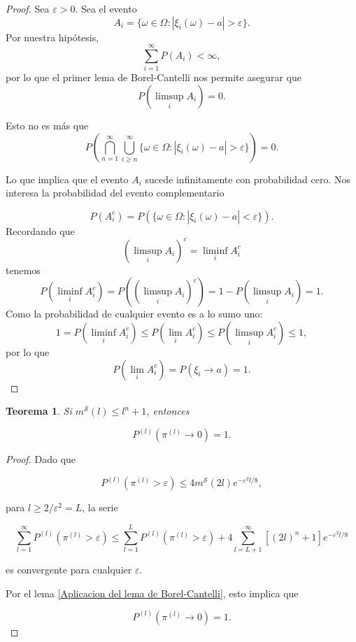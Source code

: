 \documentclass{report}
\newtheorem{thm}{Teorema}[section]
\begin{document}
\begin{proof}
    Sea $\varepsilon > 0$. Sea el evento
    \[
        A_i = \{ \omega \in \Omega : |\xi_i(\omega)-a| > \varepsilon\}.
    \]
Por nuestra hipótesis,
\[
    \sum_{i=1}^{\infty}P(A_i) < \infty,
\]
por lo que el primer lema de Borel-Cantelli nos permite asegurar que
\[
    P\left( \limsup_i A_i \right) = 0.
\]

Esto no es más que
\[
P\left( \bigcap_{n=1}^{\infty} \bigcup_{i\geq n}^{\infty} \{ \omega \in \Omega : |\xi_i(\omega)-a| > \varepsilon\} \right) = 0.
\]

Lo que implica que el evento $A_i$ sucede infinitamente con probabilidad cero. Nos interesa la probabilidad del evento complementario

\[
P(A_i^c) = P(\{ \omega \in \Omega : |\xi_i(\omega)-a| < \varepsilon\}).
\]
Recordando que
\[
\left(\limsup_i A_i\right)^c = \liminf_i A_i^c
\]
tenemos
\[
P\left(\liminf_i A_i^c\right) = P\left(\left(\limsup_i A_i\right)^c\right) = 1 - P\left( \limsup_i A_i \right) = 1.
\]
Como la probabilidad de cualquier evento es a lo sumo uno: 
\[
1 = P\left(\liminf_i A_i^c\right) \leq P\left(\lim_i A_i^c\right) \leq P\left( \limsup_i A_i^c \right) \leq 1,
\]
por lo que 
\[
P\left(\lim_i A_i^c\right) = P(\xi_i \to a) = 1.
\]
\end{proof}

\begin{thm}
    Si \( m^{\mathcal{S}}(l) \leq l^n + 1 \), entonces  

    \[
    P^{(l)}(\pi^{(l)} \to 0) = 1.
    \]
    
\end{thm} 

\begin{proof}

Dado que  

\[
P^{(l)}(\pi^{(l)} > \varepsilon) \leq 4 m^{\mathcal{S}}(2l)  e^{-\varepsilon^2 l/8},
\]

para \( l \geq 2 / \varepsilon^2 =L \), la serie  

\[
\sum_{l=1}^{\infty} P^{(l)}(\pi^{(l)} > \varepsilon) \leq \sum_{l=1}^{L} P^{(l)}(\pi^{(l)} > \varepsilon) + 4 \sum_{l=L+1}^{\infty} [(2l)^n + 1] e^{-\varepsilon^2 l/8}
\]

es convergente para cualquier \( \varepsilon \).  \newline

Por el lema \ref{Aplicacion del lema de Borel-Cantelli}, esto implica que  

\[
P^{(l)}(\pi^{(l)} \to 0) = 1.
\]
\end{proof}
\end{document}
